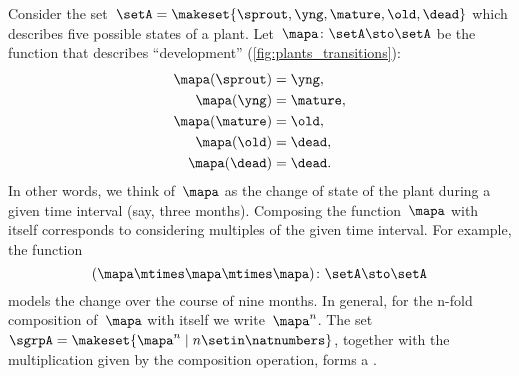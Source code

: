 \begin{example}
    \label{exa:plant-trafo-semigroup}
    Consider the set~$\setA = \makeset{ \sprout, \yng, \mature, \old, \dead }$ which describes five possible states of a plant.
    Let~$\mapa \colon \setA \sto \setA$ be the function that describes ``development'' (\cref{fig:plants_transitions}):
    \begin{align}
        \mapa(\sprout) & = \yng, \\
        \mapa(\yng)    & = \mature, \\
        \mapa(\mature) & = \old, \\
        \mapa( \old)   & = \dead, \\
        \mapa (\dead)  & = \dead.
    \end{align}
    In other words, we think of~$\mapa$ as the change of state of the plant during a given time interval (say, three months).
    Composing the function~$\mapa$ with itself corresponds to considering multiples of the given time interval.
    For example, the function
    \begin{equation}
        (\mapa \mtimes \mapa \mtimes \mapa)
        \colon \setA \sto \setA
    \end{equation}
    models the change over the course of nine months.
    In general, for the n-fold composition of~$\mapa$ with itself we write~$\mapa^n$.
    The set~$\sgrpA = \makeset{ \mapa^n \mid n \setin \natnumbers }$, together with the multiplication given by the composition operation, forms a .
\end{example}
%
